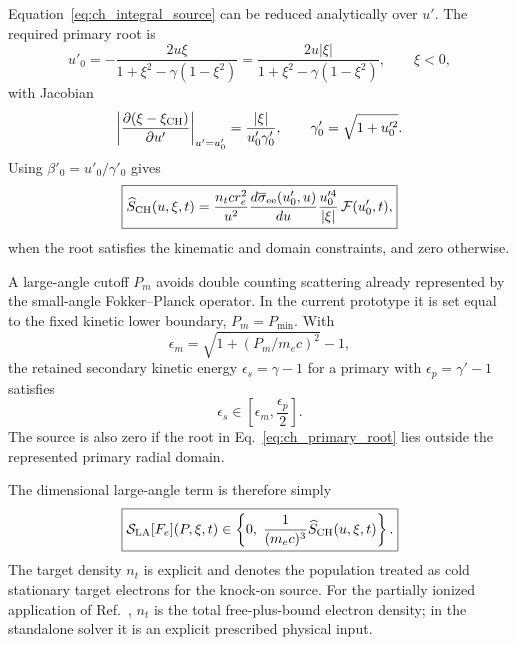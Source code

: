 \documentclass[11pt]{article}
\begin{document}
Equation~\eqref{eq:ch_integral_source} can be reduced analytically over $u'$.  The
required primary root is
\begin{equation}
 u'_0
 =-\frac{2u\xi}{1+\xi^2-\gamma(1-\xi^2)}
 =\frac{2u|\xi|}{1+\xi^2-\gamma(1-\xi^2)},
 \qquad \xi<0,
 \label{eq:ch_primary_root}
\end{equation}
with Jacobian
\begin{equation}
 \left|
 \frac{\partial(\xi-\xi_{\rm CH})}{\partial u'}
 \right|_{u'=u'_0}
 =\frac{|\xi|}{u'_0\gamma'_0},
 \qquad \gamma'_0=\sqrt{1+u_0'^2}.
 \label{eq:ch_delta_jacobian}
\end{equation}
Using $\beta'_0=u'_0/\gamma'_0$ gives
\begin{equation}
 \boxed{
 \widehat S_{\rm CH}(u,\xi,t)
 =\frac{n_t c r_e^2}{u^2}
  \frac{d\overline\sigma_{\rm ee}(u'_0,u)}{du}
  \frac{u_0'^4}{|\xi|}\,
  \mathcal F(u'_0,t),
 }
 \label{eq:ch_reduced_source}
\end{equation}
when the root satisfies the kinematic and domain constraints, and zero otherwise.

A large-angle cutoff $P_m$ avoids double counting scattering already represented
by the small-angle Fokker--Planck operator.  In the current prototype it is set equal
to the fixed kinetic lower boundary, $P_m=P_{\min}$.  With
\begin{equation}
 \epsilon_m=\sqrt{1+(P_m/m_ec)^2}-1,
\end{equation}
the retained secondary kinetic energy $\epsilon_s=\gamma-1$ for a primary with
$\epsilon_p=\gamma'-1$ satisfies
\begin{equation}
 \epsilon_s\in\left[\epsilon_m,\frac{\epsilon_p}{2}\right].
 \label{eq:ch_energy_range}
\end{equation}
The source is also zero if the root in Eq.~\eqref{eq:ch_primary_root} lies outside the
represented primary radial domain.

The dimensional large-angle term is therefore simply
\begin{equation}
 \boxed{
 \mathcal S_{\rm LA}[F_e](P,\xi,t)
 \in\left\{0,\;\frac{1}{(m_ec)^3}\widehat S_{\rm CH}(u,\xi,t)\right\}.
 }
 \label{eq:large_angle_physical_choices}
\end{equation}
The target density $n_t$ is explicit and denotes the population treated as cold
stationary target electrons for the knock-on source.  For the partially ionized
application of Ref.~, $n_t$ is the total free-plus-bound electron
density; in the standalone solver it is an explicit prescribed physical input.
\end{document}
